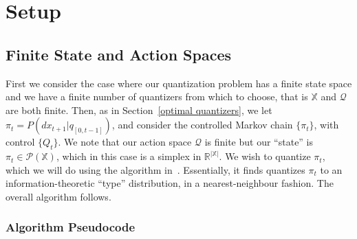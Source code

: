 \documentclass{article}
\begin{document}
\section{Setup}
\subsection{Finite State and Action Spaces}
First we consider the case where our quantization problem has a finite state space and we have a finite number of quantizers from which to choose, that is \( \mathbb{X} \) and \( \mathcal{Q} \) are both finite. Then, as in Section~\ref{optimal quantizers}, we let \( \pi_t = P(dx_{t+1} | q_{[0,t-1]}) \), and consider the controlled Markov chain \( \{\pi_t\} \), with control \( \{Q_t\} \). We note that our action space \( \mathcal{Q} \) is finite but our ``state'' is \( \pi_t \in \mathcal{P}(\mathbb{X}) \), which in this case is a simplex in \( \mathbb{R}^{|\mathbb{X}|}\). We wish to quantize \( \pi_t \), which we will do using the algorithm in~\cite{Reznik}. Essentially, it finds quantizes \( \pi_t \) to an information-theoretic ``type'' distribution, in a nearest-neighbour fashion. The overall algorithm follows.

\subsubsection{Algorithm Pseudocode}\label{algorithm1}

\newcommand\showline{\stepcounter{linenum}\thelinenum}
\end{document}
